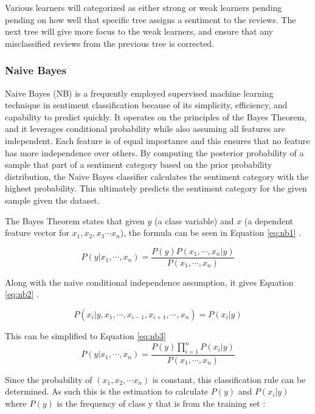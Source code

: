 \documentclass[stu,12pt,floatsintext]{apa7}
\begin{document}
Various learners will categorized as either strong or weak learners pending pending on how well that specific tree assigns a sentiment to the reviews. The next tree will give more focus to the weak learners, and ensure that any misclassified reviews from the previous tree is corrected. 

\subsubsection{Naive Bayes}
Naive Bayes (NB) is a frequently employed supervised machine learning technique in sentiment classification because of its simplicity, efficiency, and capability to predict quickly. It operates on the principles of the Bayes Theorem, and it leverages conditional probability while also assuming all features are independent. Each feature is of equal importance and this ensures that no feature has more independence over others. By computing the posterior probability of a sample that part of a sentiment category based on the prior probability distribution, the Naive Bayes classifier calculates the sentiment category with the highest probability. This ultimately predicts the sentiment category for the given sample given the dataset.

The Bayes Theorem states that given $y$ (a class variable) and $x$ (a dependent feature vector for $x_1, x_2, x_3 \cdots x_n$), the formula can be seen in Equation \ref{eq:nb1} \parencite{scikit-learn}.

\begin{equation}
    P(y|x_1,\cdots , x_n) = \frac{P(y)P(x_1,\cdots , x_n|y)}{P(x_1,\cdots , x_n)}
    \label{eq:nb1}
\end{equation}

Along with the naive conditional independence assumption, it gives Equation \ref{eq:nb2} \parencite{scikit-learn}.

\begin{equation}
    P(x_i|y,x_1,\cdots , x_{i-1},x_{i+1},\cdots , x_n) = P(x_i|y)
    \label{eq:nb2}
\end{equation}


This can be simplified to Equation \ref{eq:nb3}
\begin{equation}
    P(y|x_1, \cdots , x_n) = \frac{P(y)\prod\limits_{i=1}^{n}P(x_i|y)}{P(x_1,\cdots , x_n)}
    \label{eq:nb3}
\end{equation}

Since the probability of $(x_1, x_2, \cdots x_n)$ is constant, this classification rule can be determined. As such this is the estimation to calculate $P(y)$ and $P(x_i | y)$ where $P(y)$ is the frequency of class y that is from the training set \parencite{scikit-learn}: 
\end{document}
